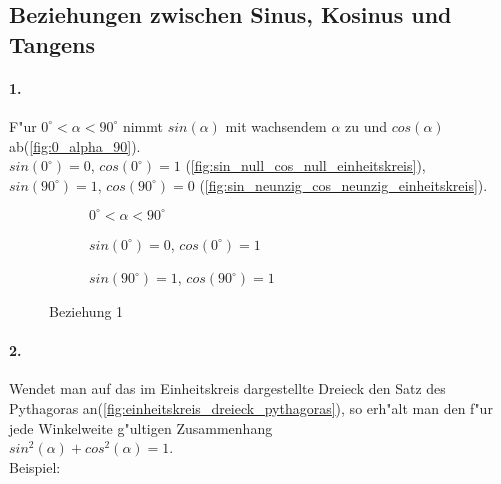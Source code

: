 \documentclass{standalone}
\begin{document}
\subsection{Beziehungen zwischen Sinus, Kosinus und Tangens}

\paragraph{1.}

\noindent F{"u}r $0^\circ < \alpha < 90^\circ$ nimmt $sin(\alpha)$ mit wachsendem $\alpha$ zu und $cos(\alpha)$ ab(\autoref{fig:0_alpha_90}). \\
$sin(0^\circ) = 0$, $cos(0^\circ) = 1$ (\autoref{fig:sin_null_cos_null_einheitskreis}), $sin(90^\circ) = 1$, $cos(90^\circ) = 0$ (\autoref{fig:sin_neunzig_cos_neunzig_einheitskreis}).

\newcommand{\smallImageSize}{130px} %
\begin{figure}[h!]
	\centering
	\begin{subfigure}[b]{0.3\linewidth}
		\def\svgwidth{\smallImageSize}
		
		\caption{$0^\circ < \alpha < 90^\circ$}
		\label{fig:0_alpha_90}
	\end{subfigure}
	\begin{subfigure}[b]{0.3\linewidth}
		\def\svgwidth{\smallImageSize}
		
		\caption{$sin(0^\circ) = 0$, $cos(0^\circ) = 1$}
		\label{fig:sin_null_cos_null_einheitskreis}
	\end{subfigure}
	\begin{subfigure}[b]{0.3\linewidth}
		\def\svgwidth{\smallImageSize}
		
		\caption{$sin(90^\circ) = 1$, $cos(90^\circ) = 1$}
		\label{fig:sin_neunzig_cos_neunzig_einheitskreis}
	\end{subfigure}
	\caption{Beziehung 1}
	\label{fig:beziehung_eins}
\end{figure}

\newpage

\paragraph{2.}

Wendet man auf das im Einheitskreis dargestellte Dreieck den Satz des Pythagoras an(\autoref{fig:einheitskreis_dreieck_pythagoras}), so erh{"a}lt man den f{"u}r jede Winkelweite g{"u}ltigen Zusammenhang \\
$sin^2(\alpha) + cos^2(\alpha) = 1$. \\
Beispiel:
\end{document}
